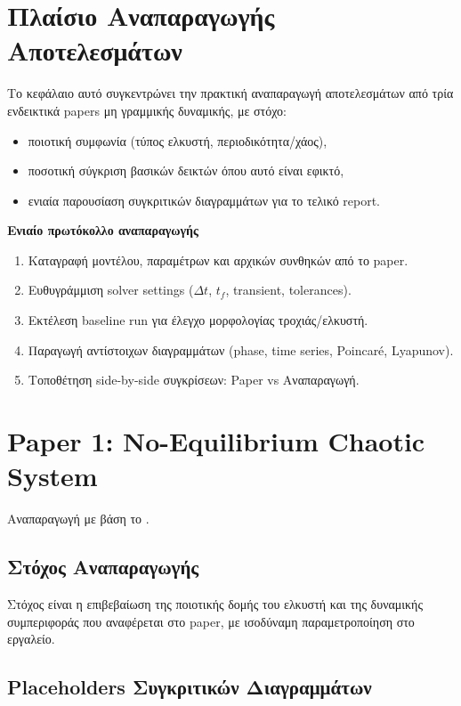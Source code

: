 \documentclass[11pt,a4paper]{report}
\begin{document}
\section{Πλαίσιο Αναπαραγωγής Αποτελεσμάτων}

Το κεφάλαιο αυτό συγκεντρώνει την πρακτική αναπαραγωγή αποτελεσμάτων από τρία ενδεικτικά papers μη γραμμικής δυναμικής, με στόχο:
\begin{itemize}
\item ποιοτική συμφωνία (τύπος ελκυστή, περιοδικότητα/χάος),
\item ποσοτική σύγκριση βασικών δεικτών όπου αυτό είναι εφικτό,
\item ενιαία παρουσίαση συγκριτικών διαγραμμάτων για το τελικό report.
\end{itemize}

\begin{guidebox}
\textbf{Ενιαίο πρωτόκολλο αναπαραγωγής}
\begin{enumerate}
\item Καταγραφή μοντέλου, παραμέτρων και αρχικών συνθηκών από το paper.
\item Ευθυγράμμιση solver settings ($\Delta t$, $t_f$, transient, tolerances).
\item Εκτέλεση baseline run για έλεγχο μορφολογίας τροχιάς/ελκυστή.
\item Παραγωγή αντίστοιχων διαγραμμάτων (phase, time series, Poincar\'e, Lyapunov).
\item Τοποθέτηση side-by-side συγκρίσεων: Paper vs Αναπαραγωγή.
\end{enumerate}
\end{guidebox}

\section{Paper 1: No-Equilibrium Chaotic System}

Αναπαραγωγή με βάση το \cite{pham2014_no_equilibrium}.

\subsection{Στόχος Αναπαραγωγής}

Στόχος είναι η επιβεβαίωση της ποιοτικής δομής του ελκυστή και της δυναμικής συμπεριφοράς που αναφέρεται στο paper, με ισοδύναμη παραμετροποίηση στο εργαλείο.

\subsection{Placeholders Συγκριτικών Διαγραμμάτων}
\end{document}
